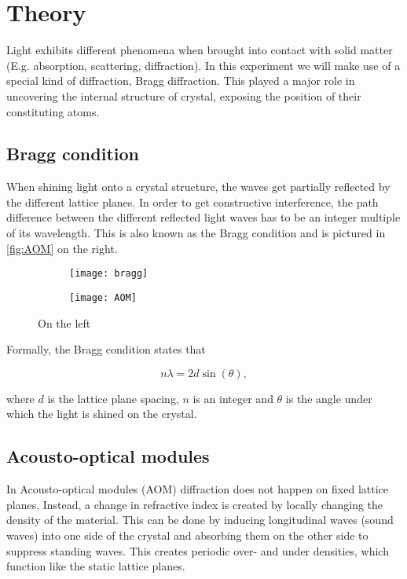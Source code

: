\def\frf{\( f_\mathrm{RF} \) }
\renewcommand{\P}[1]{P_\mathrm{#1}}


\section{Theory}
Light exhibits different phenomena when brought into contact with solid matter (E.g. absorption, scattering, diffraction). In this experiment we will make use of a special kind of diffraction, Bragg diffraction. This played a major role in uncovering the internal structure of crystal, exposing the position of their constituting atoms. 

\subsection{Bragg condition}
When shining light onto a crystal structure, the waves get partially reflected by the different lattice planes. In order to get constructive interference, the path difference between the different reflected light waves has to be an integer multiple of its wavelength. This is also known as the Bragg condition and is pictured in \autoref{fig:AOM} on the right.

\begin{figure}[H]
	\begin{subfigure}{.5\textwidth}
		\centering
		\texttt{[image: bragg]}
	\end{subfigure}
	\begin{subfigure}{.5\textwidth}
	\centering
	\texttt{[image: AOM]}
	\end{subfigure}
	\caption{On the left }
	\label{fig:AOM}
\end{figure}

 Formally, the Bragg condition states that

\begin{equation}\label{eqn:bragg}
	n\lambda = 2d\sin(\theta),
\end{equation}

where \( d \) is the lattice plane spacing, \( n \) is an integer and \( \theta \) is the angle under which the light is shined on the crystal. 

\subsection{Acousto-optical modules}
In Acousto-optical modules (AOM) diffraction does not happen on fixed lattice planes. Instead, a change in refractive index is created by locally changing the density of the material. This can be done by inducing longitudinal waves (sound waves) into one side of the crystal and absorbing them on the other side to suppress standing waves. This creates periodic over- and under densities, which function like the static lattice planes. 

